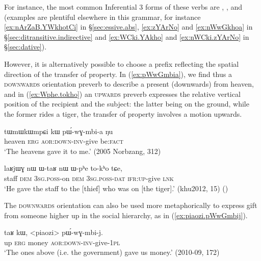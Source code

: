 For instance, the most common Inferential 3\flobv{} forms of these verbs are , ,  and  (examples are plentiful elsewhere in this grammar, for instance \ref{ex:nArZaB.YWkhotCi} in §\ref{sec:essive.abs}, \ref{ex:zYArNo} and \ref{ex:nWwGkhoa} in §\ref{sec:ditransitive.indirective} and \ref{ex:WCki.YAkho} and \ref{ex:nWCki.zYArNo} in §\ref{sec:dative}). 
 
However, it is alternatively possible to choose a prefix reflecting the spatial direction of the transfer of property. In (\ref{ex:pWwGmbia}), we find thus a \textsc{downwards} orientation preverb to describe a present (downwards) from heaven, and in (\ref{ex:Wphe.tokho}) an \textsc{upwards} preverb expresses the relative vertical position of the recipient and the subject: the latter being on the ground, while the former rides a tiger, the transfer of property involves a motion upwards.
 
\begin{exe}
\ex \label{ex:pWwGmbia}
\gll tɯmɯkɯmpɕi kɯ pɯ́-wɣ-mbi-a ŋu \\
heaven \textsc{erg} \textsc{aor}:\textsc{down}-\textsc{inv}-give be:\textsc{fact} \\
\glt `The heavens gave it to me.' (2005 Norbzang, 312)
\end{exe}

\begin{exe}
\ex \label{ex:Wphe.tokho}
\gll laʁjɯɣ nɯ ɯ-taʁ nɯ ɯ-pʰe to-kʰo tɕe,  \\
staff \textsc{dem} \textsc{3sg}.\textsc{poss}-on \textsc{dem} \textsc{3sg}.\textsc{poss}-\textsc{dat} \textsc{ifr}:\textsc{up}-give \textsc{lnk} \\
\glt `He gave the staff to the [thief] who was on [the tiger].' (khu2012, 15)
()
\end{exe}

The \textsc{downwards} orientation can also be used more metaphorically to express gift from someone higher up in the social hierarchy, as in (\ref{ex:piaozi.pWwGmbij}).

\begin{exe}
\ex \label{ex:piaozi.pWwGmbij}
\gll  taʁ kɯ, <piaozi> pɯ́-wɣ-mbi-j. \\
up \textsc{erg} money \textsc{aor}:\textsc{down}-\textsc{inv}-give-\textsc{1pl}  \\
\glt  `The ones above (i.e. the government) gave us money.' (2010-09, 172)
\end{exe}


